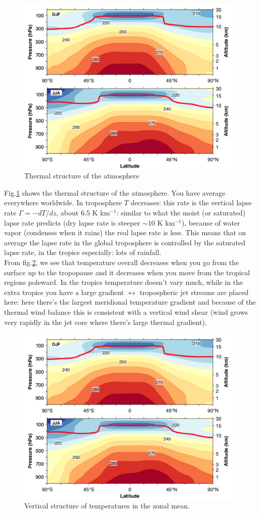 \begin{figure}[htpb]
    \centering
    \includegraphics[width=0.45\linewidth]{uploads/thermal structure.png}
    \caption{Thermal structure of the atmosphere}
    \label{fig:thermal structure}
\end{figure}
Fig.\ref{fig:thermal structure} shows the thermal structure of the atmosphere. You have average everywhere worldwide. In troposphere $T$ decreases: this rate is the vertical lapse rate $\Gamma=-dT/dz$, about $6.5$ K km$^{-1}$: similar to what the moist (or saturated) lapse rate predicts (dry lapse rate is steeper $\sim 10$ K km$^{-1}$), because of water vapor (condenses when it rains) the real lapse rate is less. This means that on average the lapse rate in the global troposphere is controlled by the saturated lapse rate, in the tropics especially: lots of rainfall. \\
[0.2 cm]

From fig.\ref{fig:vert structure of T}, we see that temperature overall decreases when you go from the surface up to the tropopause and it decreases when you move from the tropical regions poleward. In the tropics temperature doesn't vary much, while in the extra tropics you have a large gradient $\leftrightarrow$ tropospheric jet streams are placed here: here there's the largest meridional temperature gradient and because of the thermal wind balance this is consistent with a vertical wind shear (wind grows very rapidly in the jet core where there's large thermal gradient).
\begin{figure}[h]
    \centering
    \includegraphics[width=0.5\linewidth]{uploads/Thermal structure.png}
    \caption{Vertical structure of temperatures in the zonal mean.}
    \label{fig:vert structure of T}
\end{figure}


